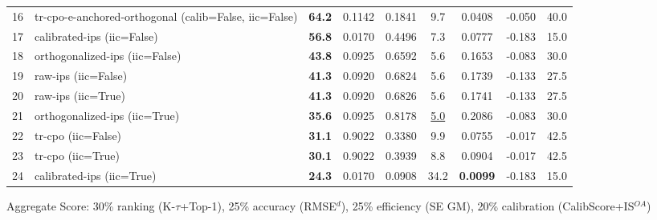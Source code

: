 \begin{table}[htbp]
\begin{tabular}{cl|c|cccccc}
16 & tr-cpo-e-anchored-orthogonal (calib=False, iic=False) & \textbf{64.2} & 0.1142 & 0.1841 & 9.7 & 0.0408 & -0.050 & 40.0 \\
17 & calibrated-ips (iic=False) & \textbf{56.8} & 0.0170 & 0.4496 & 7.3 & 0.0777 & -0.183 & 15.0 \\
18 & orthogonalized-ips (iic=False) & \textbf{43.8} & 0.0925 & 0.6592 & 5.6 & 0.1653 & -0.083 & 30.0 \\
19 & raw-ips (iic=False) & \textbf{41.3} & 0.0920 & 0.6824 & 5.6 & 0.1739 & -0.133 & 27.5 \\
20 & raw-ips (iic=True) & \textbf{41.3} & 0.0920 & 0.6826 & 5.6 & 0.1741 & -0.133 & 27.5 \\
21 & orthogonalized-ips (iic=True) & \textbf{35.6} & 0.0925 & 0.8178 & \underline{5.0} & 0.2086 & -0.083 & 30.0 \\
22 & tr-cpo (iic=False) & \textbf{31.1} & 0.9022 & 0.3380 & 9.9 & 0.0755 & -0.017 & 42.5 \\
23 & tr-cpo (iic=True) & \textbf{30.1} & 0.9022 & 0.3939 & 8.8 & 0.0904 & -0.017 & 42.5 \\
24 & calibrated-ips (iic=True) & \textbf{24.3} & 0.0170 & 0.0908 & 34.2 & \textbf{0.0099} & -0.183 & 15.0 \\
\bottomrule
\end{tabular}
\footnotesize{Aggregate Score: 30\% ranking (K-$\tau$+Top-1), 25\% accuracy (RMSE$^d$), 25\% efficiency (SE GM), 20\% calibration (CalibScore+IS$^{OA}$)}
\end{table}